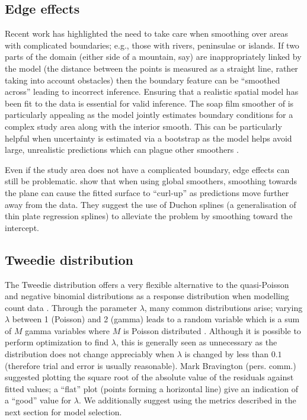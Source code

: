 \documentclass[a4paper,12pt]{article}
\begin{document}
\subsection*{Edge effects}
\label{s:leakage}

Recent work \citep{Ramsay:2002uo,Wang:2007tf,Wood:2008vo,ScottHayward:2011tc,Miller:2012tm} has highlighted the need to take care when smoothing over areas with complicated boundaries; e.g., those with rivers, peninsulae or islands. If two parts of the domain (either side of a mountain, say) are inappropriately linked by the model (the distance between the points is measured as a straight line, rather taking into account obstacles) then the boundary feature can be ``smoothed across'' leading to incorrect inference. Ensuring that a realistic spatial model has been fit to the data is essential for valid inference. The soap film smoother of \cite{Wood:2008vo} is particularly appealing as the model jointly estimates boundary conditions for a complex study area along with the interior smooth. This can be particularly helpful when uncertainty is estimated via a bootstrap as the model helps avoid large, unrealistic predictions which can plague other smoothers \citep{Bravington:2009vo}.

Even if the study area does not have a complicated boundary, edge effects can still be problematic. \cite{Miller:wx} show that when using global smoothers, smoothing towards the plane can cause the fitted surface to ``curl-up'' as predictions move further away from the data. They suggest the use of Duchon splines (a generalisation of thin plate regression splines) to alleviate the problem by smoothing toward the intercept.

\subsection*{Tweedie distribution}
\label{s:Tweedie}

The Tweedie distribution offers a very flexible alternative to the quasi-Poisson and negative binomial distributions as a response distribution when modelling count data \citep{Candy:2004tb}. Through the parameter $\lambda$, many common distributions arise; varying $\lambda$ between 1 (Poisson) and 2 (gamma) leads to a random variable which is a sum of $M$ gamma variables where $M$ is Poisson distributed \citep{Jorgensen:1987vg}. Although it is possible to perform optimization to find $\lambda$, this is generally seen as unnecessary as the distribution does not change appreciably when $\lambda$ is changed by less than $0.1$ (therefore trial and error is usually reasonable). Mark Bravington (pers. comm.) suggested plotting the square root of the absolute value of the residuals against fitted values; a ``flat'' plot (points forming a horizontal line) give an indication of a ``good'' value for $\lambda$. We additionally suggest using the metrics described in the next section for model selection.
\end{document}
